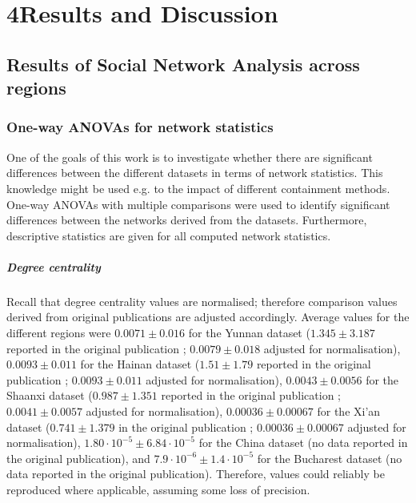 \chapter{4\quad Results and Discussion}
\label{ch:results_discussion}

\section{Results of Social Network Analysis across regions}
\label{sec:res_sna}

\subsection{One-way ANOVAs for network statistics}
\label{sec:sna_anovas}

One of the goals of this work is to investigate whether there are significant differences between the different datasets in terms of network statistics. This knowledge might be used e.g. to the impact of different containment methods. One-way ANOVAs with multiple comparisons were used to identify significant differences between the networks derived from the datasets. Furthermore, descriptive statistics are given for all computed network statistics.

\paragraph{Degree centrality} Recall that degree centrality values are normalised; therefore comparison values derived from original publications are adjusted accordingly. Average values for the different regions were $0.0071\pm0.016$ for the Yunnan dataset ($1.345\pm3.187$ reported in the original publication \cite{hainan_publication}; $0.0079\pm0.018$ adjusted for normalisation), $0.0093\pm0.011$ for the Hainan dataset ($1.51\pm1.79$ reported in the original publication \cite{hainan_publication}; $0.0093\pm0.011$ adjusted for normalisation), $0.0043\pm0.0056$ for the Shaanxi dataset ($0.987\pm1.351$ reported in the original publication \cite{shaanxi_publication}; $0.0041\pm0.0057$ adjusted for normalisation), $0.00036\pm0.00067$ for the Xi'an dataset ($0.741\pm1.379$ in the original publication \cite{xian_publication}; $0.00036\pm0.00067$ adjusted for normalisation), $1.80\cdot 10^{-5}\pm6.84\cdot 10^{-5}$ for the China dataset (no data reported in the original publication), and $7.9\cdot 10^{-6}\pm1.4\cdot 10^{-5}$ for the Bucharest dataset (no data reported in the original publication). Therefore, values could reliably be reproduced where applicable, assuming some loss of precision.

